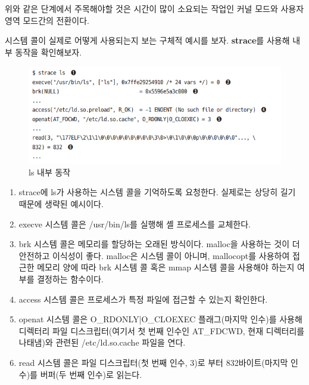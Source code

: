 \begin{flushleft}
    위와 같은 단계에서 주목해야할 것은
    시간이 많이 소요되는 작업인 커널 모드와 사용자 영역 모드간의 전환이다.
\end{flushleft}

\begin{flushleft}
    시스템 콜이 실제로 어떻게 사용되는지 보는 구체적 예시를 보자.
    \textbf{strace}를 사용해 내부 동작을 확인해보자.
\end{flushleft}

\begin{figure}[h]
    \centering
    \includegraphics[width=15cm]{resource/strace-example.png}
    \caption{ls 내부 동작}
\end{figure}

\begin{enumerate}
    \item strace에 ls가 사용하는 시스템 콜을 기억하도록 요청한다.
        실제로는 상당히 길기 때문에 생략된 예시이다.
    \item execve 시스템 콜은 /usr/bin/ls를 실행해 셸 프로세스를 교체한다.
    \item brk 시스템 콜은 메모리를 할당하는 오래된 방식이다.
        malloc을 사용하는 것이 더 안전하고 이식성이 좋다.
        malloc은 시스템 콜이 아니며, mallocopt를 사용하여 접근한 메모리 양에 따라
        brk 시스템 콜 혹은 mmap 시스템 콜을 사용해야 하는지 여부를 결정하는 함수이다.
    \item access 시스템 콜은 프로세스가 특정 파일에 접근할 수 있는지 확인한다.
    \item openat 시스템 콜은 O\_RDONLY|O\_CLOEXEC 플래그(마지막 인수)를 사용해
        디렉터리 파일 디스크립터(여기서 첫 번째 인수인 AT\_FDCWD, 현재 디렉터리를 나태냄)와
        관련된 /etc/ld.so.cache 파일을 연다.
    \item read 시스템 콜은 파일 디스크립터(첫 번째 인수, 3)로 부터 832바이트(마지막 인수)를
        버퍼(두 번째 인수)로 읽는다.
\end{enumerate}

